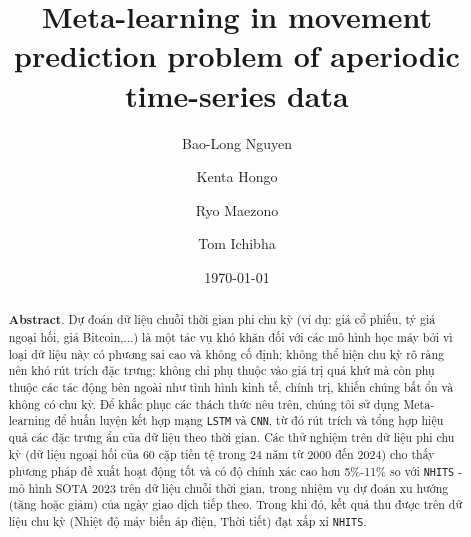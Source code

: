 \documentclass[aps,prb,groupedaddress,twocolumn,showpacs,dvipdfmx,superscriptaddress,pdftex]{revtex4-2}
\begin{document}
\title{
    Meta-learning in movement prediction problem of aperiodic time-series data
}

\author{Bao-Long Nguyen}
%
\author{Kenta Hongo}
%
\author{Ryo Maezono}
%
\author{Tom Ichibha}
%
\date{\today}
\begin{abstract}


    \textbf{Abstract}. Dự đoán dữ liệu chuỗi thời gian phi chu kỳ (ví dụ: giá cổ phiếu, tỷ giá ngoại hối, giá Bitcoin,...) là một tác vụ khó khăn đối với các mô hình học máy bởi vì loại dữ liệu này có phương sai cao và không cố định; không thể hiện chu kỳ rõ ràng nên khó rút trích đặc trưng; không chỉ phụ thuộc vào giá trị quá khứ mà còn phụ thuộc các tác động bên ngoài như tình hình kinh tế, chính trị, khiến chúng bất ổn và không có chu kỳ. Để khắc phục các thách thức nêu trên, chúng tôi sử dụng Meta-learning để huấn luyện kết hợp mạng \verb|LSTM| và \verb|CNN|, từ đó rút trích và tổng hợp hiệu quả các đặc trưng ẩn của dữ liệu theo thời gian. Các thử nghiệm trên dữ liệu phi chu kỳ (dữ liệu ngoại hối của 60 cặp tiền tệ trong 24 năm từ 2000 đến 2024) cho thấy phương pháp đề xuất hoạt động tốt và có độ chính xác cao hơn 5\%-11\% so với \verb|NHITS| - mô hình SOTA 2023 trên dữ liệu chuỗi thời gian, trong nhiệm vụ dự đoán xu hướng (tăng hoặc giảm) của ngày giao dịch tiếp theo. Trong khi đó, kết quả thu được trên dữ liệu chu kỳ (Nhiệt độ máy biến áp điện, Thời tiết) đạt xấp xỉ \verb|NHITS|.
\end{abstract}
\end{document}
